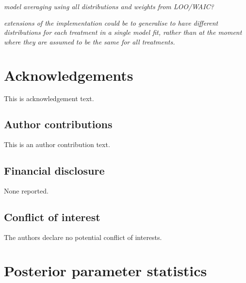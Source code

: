 \documentclass[AMA,STIX1COL]{WileyNJD-v2}
\begin{document}
{\it model averaging using all distributions and weights from LOO/WAIC?}

{\it extensions of the implementation could be to generalise to have different distributions for each treatment in a single model fit, rather than at the moment where they are assumed to be the same for all treatments.}



\section*{Acknowledgements}
This is acknowledgement text.

\subsection*{Author contributions}

This is an author contribution text.

\subsection*{Financial disclosure}

None reported.

\subsection*{Conflict of interest}

The authors declare no potential conflict of interests.




\appendix

\section{Posterior parameter statistics \label{app1}}
\end{document}
